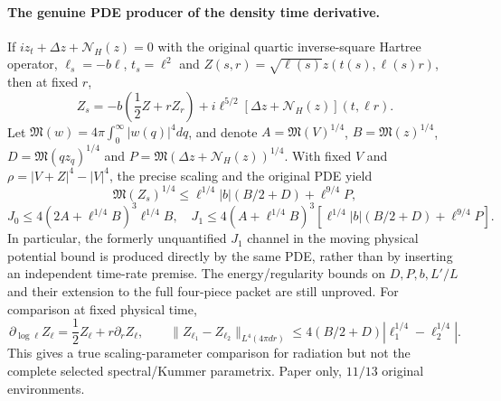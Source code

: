 \paragraph{The genuine PDE producer of the density time derivative.}
If $iz_t+\Delta z+\mathcal N_H(z)=0$ with the original quartic
inverse-square Hartree operator, $\ell_s=-b\ell$, $t_s=\ell^2$ and
$Z(s,r)=\sqrt{\ell(s)}z(t(s),\ell(s)r)$, then at fixed $r$,
\[
 Z_s=-b\left(\frac12Z+rZ_r\right)
 +i\ell^{5/2}[\Delta z+\mathcal N_H(z)](t,\ell r).
\]
Let $\mathfrak M(w)=4\pi\int_0^\infty|w(q)|^4dq$, and denote
$A=\mathfrak M(V)^{1/4}$,
$B=\mathfrak M(z)^{1/4}$,
$D=\mathfrak M(qz_q)^{1/4}$ and
$P=\mathfrak M(\Delta z+\mathcal N_H(z))^{1/4}$.
With fixed $V$ and $\rho=|V+Z|^4-|V|^4$, the precise scaling and
the original PDE yield
\[
 \mathfrak M(Z_s)^{1/4}
 \le\ell^{1/4}|b|(B/2+D)+\ell^{9/4}P,
\]
\[
 J_0\le4(2A+\ell^{1/4}B)^3\ell^{1/4}B,\quad
 J_1\le4(A+\ell^{1/4}B)^3
 [\ell^{1/4}|b|(B/2+D)+\ell^{9/4}P].
\]
In particular, the formerly unquantified $J_1$ channel in the
moving physical potential bound is produced directly by the same
PDE, rather than by inserting an independent time-rate premise.
The energy/regularity bounds on $D,P,b,L'/L$ and their extension
to the full four-piece packet are still unproved.
For comparison at fixed physical time,
\[
 \partial_{\log\ell}Z_\ell
 =\frac12Z_\ell+r\partial_rZ_\ell,\qquad
 \|Z_{\ell_1}-Z_{\ell_2}\|_{L^4(4\pi dr)}
 \le4(B/2+D)|\ell_1^{1/4}-\ell_2^{1/4}|.
\]
This gives a true scaling-parameter comparison for radiation but
not the complete selected spectral/Kummer parametrix.
Paper only, $11/13$ original environments.
